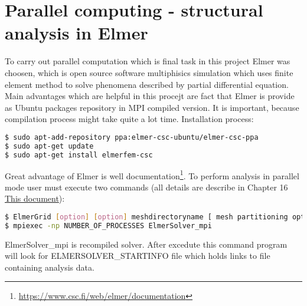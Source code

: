 \documentclass[11pt]{article}
\begin{document}
\section{Parallel computing - structural analysis in Elmer}
To carry out parallel computation which is final task in this project Elmer was choosen, which is open source software multiphisics simulation which uses finite element method to solve phenomena described by partial differential equation. Main advantages which are helpful in this procejt are fact that Elmer is provide as Ubuntu packages repository in MPI compiled version. It is important, because compilation process might take quite a lot time. Installation process:
\begin{lstlisting}[language=bash]
$ sudo apt-add-repository ppa:elmer-csc-ubuntu/elmer-csc-ppa
$ sudo apt-get update
$ sudo apt-get install elmerfem-csc
\end{lstlisting}
Great advantage of Elmer is well documentation\footnote{\url{https://www.csc.fi/web/elmer/documentation}}.
To perform analysis in parallel mode user must execute two commands (all details are describe in Chapter 16 \hyperlink{http://www.nic.funet.fi/pub/sci/physics/elmer/doc/ElmerSolverManual.pdf}{This document}):
\begin{lstlisting}[language=bash]
$ ElmerGrid [option] [option] meshdirectoryname [ mesh partitioning option]
$ mpiexec -np NUMBER_OF_PROCESSES ElmerSolver_mpi
\end{lstlisting}
ElmerSolver\_mpi is recompiled  solver. After excedute this command program will look for ELMERSOLVER\_STARTINFO file which holds links to file containing analysis data.
\end{document}
